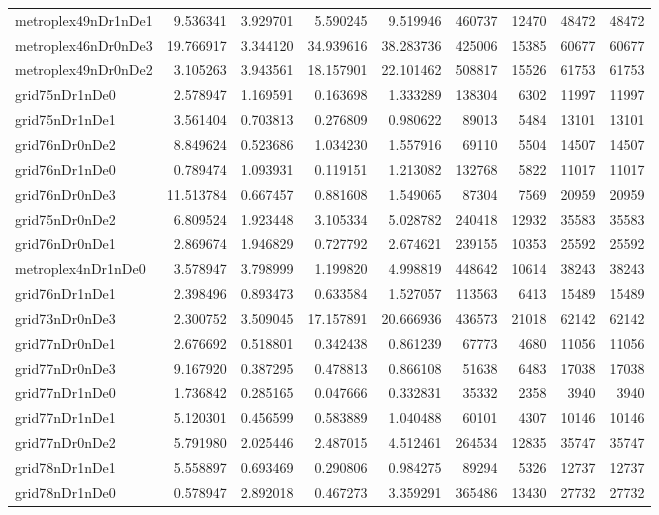 \begin{longtable}{|l|r|r|r|r|r|r|r|r|}
metroplex49nDr1nDe1 & 9.536341 & 3.929701 & 5.590245 & 9.519946 & 460737 & 12470 & 48472 & 48472 \\
metroplex46nDr0nDe3 & 19.766917 & 3.344120 & 34.939616 & 38.283736 & 425006 & 15385 & 60677 & 60677 \\
metroplex49nDr0nDe2 & 3.105263 & 3.943561 & 18.157901 & 22.101462 & 508817 & 15526 & 61753 & 61753 \\
grid75nDr1nDe0 & 2.578947 & 1.169591 & 0.163698 & 1.333289 & 138304 & 6302 & 11997 & 11997 \\
grid75nDr1nDe1 & 3.561404 & 0.703813 & 0.276809 & 0.980622 & 89013 & 5484 & 13101 & 13101 \\
grid76nDr0nDe2 & 8.849624 & 0.523686 & 1.034230 & 1.557916 & 69110 & 5504 & 14507 & 14507 \\
grid76nDr1nDe0 & 0.789474 & 1.093931 & 0.119151 & 1.213082 & 132768 & 5822 & 11017 & 11017 \\
grid76nDr0nDe3 & 11.513784 & 0.667457 & 0.881608 & 1.549065 & 87304 & 7569 & 20959 & 20959 \\
grid75nDr0nDe2 & 6.809524 & 1.923448 & 3.105334 & 5.028782 & 240418 & 12932 & 35583 & 35583 \\
grid76nDr0nDe1 & 2.869674 & 1.946829 & 0.727792 & 2.674621 & 239155 & 10353 & 25592 & 25592 \\
metroplex4nDr1nDe0 & 3.578947 & 3.798999 & 1.199820 & 4.998819 & 448642 & 10614 & 38243 & 38243 \\
grid76nDr1nDe1 & 2.398496 & 0.893473 & 0.633584 & 1.527057 & 113563 & 6413 & 15489 & 15489 \\
grid73nDr0nDe3 & 2.300752 & 3.509045 & 17.157891 & 20.666936 & 436573 & 21018 & 62142 & 62142 \\
grid77nDr0nDe1 & 2.676692 & 0.518801 & 0.342438 & 0.861239 & 67773 & 4680 & 11056 & 11056 \\
grid77nDr0nDe3 & 9.167920 & 0.387295 & 0.478813 & 0.866108 & 51638 & 6483 & 17038 & 17038 \\
grid77nDr1nDe0 & 1.736842 & 0.285165 & 0.047666 & 0.332831 & 35332 & 2358 & 3940 & 3940 \\
grid77nDr1nDe1 & 5.120301 & 0.456599 & 0.583889 & 1.040488 & 60101 & 4307 & 10146 & 10146 \\
grid77nDr0nDe2 & 5.791980 & 2.025446 & 2.487015 & 4.512461 & 264534 & 12835 & 35747 & 35747 \\
grid78nDr1nDe1 & 5.558897 & 0.693469 & 0.290806 & 0.984275 & 89294 & 5326 & 12737 & 12737 \\
grid78nDr1nDe0 & 0.578947 & 2.892018 & 0.467273 & 3.359291 & 365486 & 13430 & 27732 & 27732 \\

\end{longtable}

